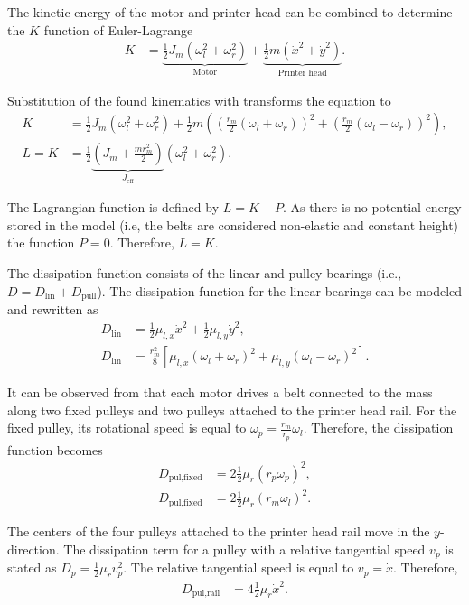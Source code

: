 \documentclass[a4paper,11pt]{article}
\begin{document}
The kinetic energy of the motor and printer head can be combined to determine the $K$ function of Euler-Lagrange
\begin{align}
    K &= \underbrace{\frac{1}{2}J_m\left(\omega_l^2+\omega_r^2\right)}_{\text{Motor}}+\underbrace{\frac{1}{2}m\left(\dot{x}^2+\dot{y}^2\right)}_{\text{Printer head}}.
\end{align}

Substitution of the found kinematics with  transforms the equation to
\begin{align}
    K &= \frac{1}{2}J_m\left(\omega_l^2+\omega_r^2\right)+\frac{1}{2}m\left(\left(\frac{r_m}{2} \left(\omega_l + \omega_r\right)\right)^2+\left(\frac{r_m}{2} \left(\omega_l - \omega_r\right)\right)^2\right),\\
    L = K &= \frac{1}{2}\underbrace{\left(J_m+\frac{mr_m^2}{2}\right)}_{J_{\text{eff}}}\left(\omega_l^2+\omega_r^2\right)\label{eq:kinetic_energy}.
\end{align}

The Lagrangian function is defined by $L=K-P$. As there is no potential energy stored in the model (i.e, the belts are considered non-elastic and constant height) the function $P=0$. Therefore, $L=K$.

The dissipation function consists of the linear and pulley bearings (i.e., $D=D_{\text{lin}}+D_{\text{pull}}$). The dissipation function for the linear bearings can be modeled and rewritten as
\begin{align}
    D_{\text{lin}} &= \frac{1}{2} \mu_{l,x} \dot{x}^2+ \frac{1}{2} \mu_{l,y} \dot{y}^2,\\
    D_{\text{lin}} &= \frac{r_m^2}{8}\left[\mu_{l,x}\left(\omega_l+\omega_r\right)^2+\mu_{l,y}\left(\omega_l-\omega_r\right)^2\right].
\end{align}

It can be observed from  that each motor drives a belt connected to the mass along two fixed pulleys and two pulleys attached to the printer head rail. For the fixed pulley, its rotational speed is equal to $\omega_{p}=\frac{r_m}{r_p}\omega_l$. Therefore, the dissipation function becomes 
\begin{align*}
    D_{\text{pul,fixed}} &= 2\frac{1}{2}\mu_r\left(r_p \omega_p\right)^2,\\
    D_{\text{pul,fixed}} &= 2\frac{1}{2}\mu_r\left(r_m \omega_l\right)^2.
\end{align*}

The centers of the four pulleys attached to the printer head rail move in the $y$-direction. The dissipation term for a pulley with a relative tangential speed $v_p$ is stated as $D_p=\frac{1}{2}\mu_rv_p^2$. The relative tangential speed is equal to $v_p=\dot{x}$. Therefore,
\begin{align}
    D_{\text{pul,rail}} &= 4\frac{1}{2}\mu_r \dot{x}^2.
\end{align}
\end{document}
